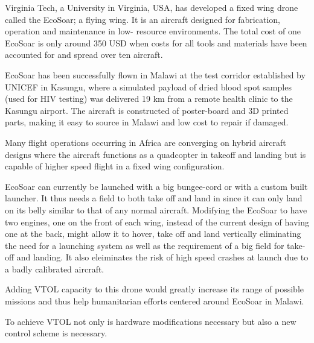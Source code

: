 Virginia Tech, a University in Virginia, USA, has developed a fixed wing drone called the EcoSoar; a flying wing.
It is an aircraft designed for fabrication, operation and maintenance in low-
resource environments.
The total cost of one EcoSoar is only around 350 USD when costs for all tools and materials have been accounted for and spread over ten aircraft.

EcoSoar has been successfully flown in Malawi at the test corridor established by UNICEF in Kasungu, where a simulated payload of dried blood spot samples (used for HIV testing) was delivered 19 km from a remote health clinic to the Kasungu airport.
The aircraft is constructed of poster-board and 3D printed parts, making it easy to source in Malawi and low cost to repair if damaged.

Many flight operations occurring in Africa are converging on hybrid aircraft designs where the aircraft functions as a quadcopter in takeoff and landing but is capable of higher speed flight in a fixed wing configuration.

EcoSoar can currently be launched with a big bungee-cord or with a custom built launcher. It thus needs a field to both take off and land in since it can only land on its belly similar to that of any normal aircraft.
Modifying the EcoSoar to have two engines, one on the front of each wing, instead of the current design of having one at the back, might allow it to hover, take off and land vertically eliminating the need for a launching system as well as the requirement of a big field for take-off and landing.
It also eleiminates the risk of high speed crashes at launch due to a badly calibrated aircraft.

Adding VTOL capacity to this drone would greatly increase its range of possible missions and thus help humanitarian efforts centered around EcoSoar in Malawi.

To achieve VTOL not only is hardware modifications necessary but also a new control scheme is necessary.